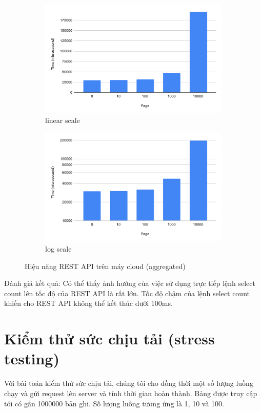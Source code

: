 \begin{figure}[H]
\centering
\begin{subfigure}{0.5\textwidth}
    \centering
    \includegraphics[width=\textwidth]
    {images/testing/view-aggregated-cloud.png}
    \caption{linear scale}
\end{subfigure}%
\begin{subfigure}{0.5\textwidth}
    \centering
    \includegraphics[width=\textwidth]
    {images/testing/view-aggregated-cloud-log.png}
    \caption{log scale}
\end{subfigure}
\caption{Hiệu năng REST API trên máy cloud (aggregated)}
\end{figure}

Đánh giá kết quả: Có thể thấy ảnh hưởng của việc sử dụng
trực tiếp lệnh select count lên tốc độ của REST API là rất lớn.
Tốc độ chậm của lệnh select count khiến cho REST API không thể kết thúc
dưới 100ms.

\section{Kiểm thử sức chịu tải (stress testing)}
Với bài toán kiểm thử sức chịu tải, chúng tôi cho đồng thời
một số lượng luồng chạy và gửi request lên server và
tính thời gian hoàn thành. Bảng được truy cập tới
có gần 1000000 bản ghi. Số lượng luồng tương ứng
là 1, 10 và 100.

